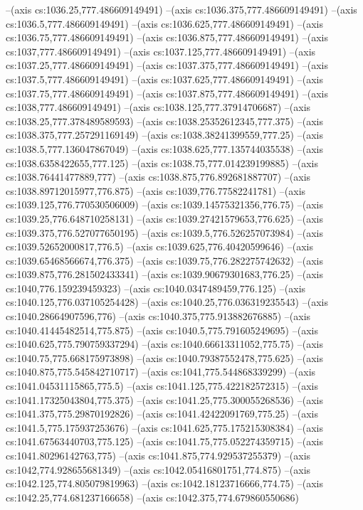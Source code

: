 --(axis cs:1036.25,777.486609149491)
--(axis cs:1036.375,777.486609149491)
--(axis cs:1036.5,777.486609149491)
--(axis cs:1036.625,777.486609149491)
--(axis cs:1036.75,777.486609149491)
--(axis cs:1036.875,777.486609149491)
--(axis cs:1037,777.486609149491)
--(axis cs:1037.125,777.486609149491)
--(axis cs:1037.25,777.486609149491)
--(axis cs:1037.375,777.486609149491)
--(axis cs:1037.5,777.486609149491)
--(axis cs:1037.625,777.486609149491)
--(axis cs:1037.75,777.486609149491)
--(axis cs:1037.875,777.486609149491)
--(axis cs:1038,777.486609149491)
--(axis cs:1038.125,777.37914706687)
--(axis cs:1038.25,777.378489589593)
--(axis cs:1038.25352612345,777.375)
--(axis cs:1038.375,777.257291169149)
--(axis cs:1038.38241399559,777.25)
--(axis cs:1038.5,777.136047867049)
--(axis cs:1038.625,777.135744035538)
--(axis cs:1038.6358422655,777.125)
--(axis cs:1038.75,777.014239199885)
--(axis cs:1038.76441477889,777)
--(axis cs:1038.875,776.892681887707)
--(axis cs:1038.89712015977,776.875)
--(axis cs:1039,776.77582241781)
--(axis cs:1039.125,776.770530506009)
--(axis cs:1039.14575321356,776.75)
--(axis cs:1039.25,776.648710258131)
--(axis cs:1039.27421579653,776.625)
--(axis cs:1039.375,776.527077650195)
--(axis cs:1039.5,776.526257073984)
--(axis cs:1039.52652000817,776.5)
--(axis cs:1039.625,776.40420599646)
--(axis cs:1039.65468566674,776.375)
--(axis cs:1039.75,776.282275742632)
--(axis cs:1039.875,776.281502433341)
--(axis cs:1039.90679301683,776.25)
--(axis cs:1040,776.159239459323)
--(axis cs:1040.0347489459,776.125)
--(axis cs:1040.125,776.037105254428)
--(axis cs:1040.25,776.036319235543)
--(axis cs:1040.28664907596,776)
--(axis cs:1040.375,775.913882676885)
--(axis cs:1040.41445482514,775.875)
--(axis cs:1040.5,775.791605249695)
--(axis cs:1040.625,775.790759337294)
--(axis cs:1040.66613311052,775.75)
--(axis cs:1040.75,775.668175973898)
--(axis cs:1040.79387552478,775.625)
--(axis cs:1040.875,775.545842710717)
--(axis cs:1041,775.544868339299)
--(axis cs:1041.04531115865,775.5)
--(axis cs:1041.125,775.422182572315)
--(axis cs:1041.17325043804,775.375)
--(axis cs:1041.25,775.300055268536)
--(axis cs:1041.375,775.29870192826)
--(axis cs:1041.42422091769,775.25)
--(axis cs:1041.5,775.175937253676)
--(axis cs:1041.625,775.175215308384)
--(axis cs:1041.67563440703,775.125)
--(axis cs:1041.75,775.052274359715)
--(axis cs:1041.80296142763,775)
--(axis cs:1041.875,774.929537255379)
--(axis cs:1042,774.928655681349)
--(axis cs:1042.05416801751,774.875)
--(axis cs:1042.125,774.805079819963)
--(axis cs:1042.18123716666,774.75)
--(axis cs:1042.25,774.681237166658)
--(axis cs:1042.375,774.679860550686)
